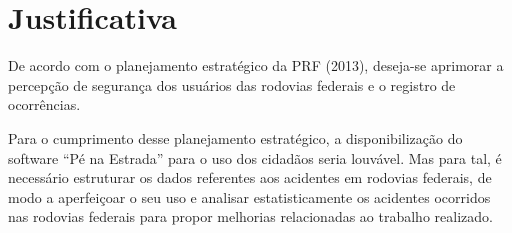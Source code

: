 \chapter[Justificativa]{Justificativa}

De acordo com o planejamento estratégico da PRF (2013), deseja-se aprimorar a
percepção de segurança dos usuários das rodovias federais e o registro de ocorrências.

Para o cumprimento desse planejamento estratégico, a disponibilização do software
“Pé na Estrada” para o uso dos cidadãos seria louvável. Mas para tal, é necessário
estruturar os dados referentes aos acidentes em rodovias federais, de modo a aperfeiçoar o
seu uso e analisar estatisticamente os acidentes ocorridos nas rodovias federais para
propor melhorias relacionadas ao trabalho realizado.